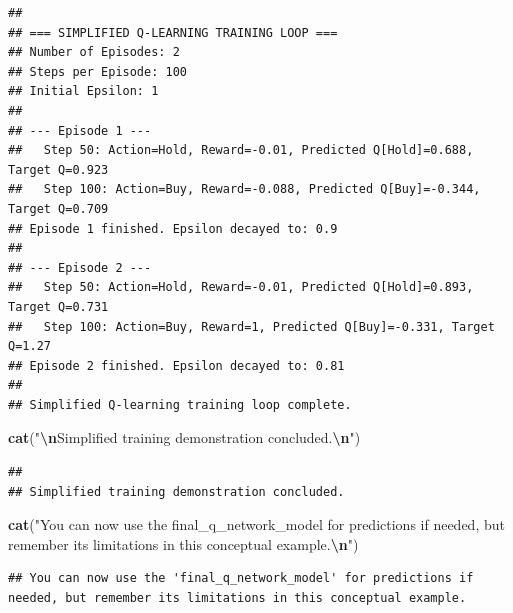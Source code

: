 \documentclass[
]{article}
\newenvironment{Shaded}{\begin{snugshade}}{\end{snugshade}}
\newcommand{\FunctionTok}[1]{\textcolor[rgb]{0.13,0.29,0.53}{\textbf{#1}}}
\newcommand{\NormalTok}[1]{#1}
\newcommand{\SpecialCharTok}[1]{\textcolor[rgb]{0.81,0.36,0.00}{\textbf{#1}}}
\newcommand{\StringTok}[1]{\textcolor[rgb]{0.31,0.60,0.02}{#1}}
\begin{document}
\begin{verbatim}
## 
## === SIMPLIFIED Q-LEARNING TRAINING LOOP ===
## Number of Episodes: 2 
## Steps per Episode: 100 
## Initial Epsilon: 1 
## 
## --- Episode 1 ---
##   Step 50: Action=Hold, Reward=-0.01, Predicted Q[Hold]=0.688, Target Q=0.923
##   Step 100: Action=Buy, Reward=-0.088, Predicted Q[Buy]=-0.344, Target Q=0.709
## Episode 1 finished. Epsilon decayed to: 0.9
## 
## --- Episode 2 ---
##   Step 50: Action=Hold, Reward=-0.01, Predicted Q[Hold]=0.893, Target Q=0.731
##   Step 100: Action=Buy, Reward=1, Predicted Q[Buy]=-0.331, Target Q=1.27
## Episode 2 finished. Epsilon decayed to: 0.81
## 
## Simplified Q-learning training loop complete.
\end{verbatim}

\begin{Shaded}
\begin{Highlighting}[]
\FunctionTok{cat}\NormalTok{(}\StringTok{"}\SpecialCharTok{\textbackslash{}n}\StringTok{Simplified training demonstration concluded.}\SpecialCharTok{\textbackslash{}n}\StringTok{"}\NormalTok{)}
\end{Highlighting}
\end{Shaded}

\begin{verbatim}
## 
## Simplified training demonstration concluded.
\end{verbatim}

\begin{Shaded}
\begin{Highlighting}[]
\FunctionTok{cat}\NormalTok{(}\StringTok{"You can now use the \textquotesingle{}final\_q\_network\_model\textquotesingle{} for predictions if needed, but remember its limitations in this conceptual example.}\SpecialCharTok{\textbackslash{}n}\StringTok{"}\NormalTok{)}
\end{Highlighting}
\end{Shaded}

\begin{verbatim}
## You can now use the 'final_q_network_model' for predictions if needed, but remember its limitations in this conceptual example.
\end{verbatim}
\end{document}
